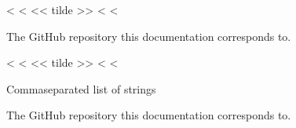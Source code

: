 \documentclass[letterpaper,10pt,english]{sphinxmanual}
\begin{document}
\vspace{5px}

\begin{fulllineitems}
\label{\detokenize{confval:confval-github_repository}}
<%
\pysigstartsignatures
<%
<< tilde >>
<%
<%
\vspace{-45px}

\begin{DUlineblock}{0em}
\item[]  
\item[]  
\end{DUlineblock}

\vspace{-25px}

The GitHub repository this documentation corresponds to.

\end{fulllineitems}



\vspace{5px}

\begin{fulllineitems}
\label{\detokenize{confval:confval-conda_channels}}
<%
\pysigstartsignatures
<%
<< tilde >>
<%
<%
\vspace{-45px}

\begin{DUlineblock}{0em}
\item[]  Comma\sphinxhyphen{}separated list of strings
\item[]  
\end{DUlineblock}

\vspace{-25px}

The GitHub repository this documentation corresponds to.

\end{fulllineitems}
\end{document}
